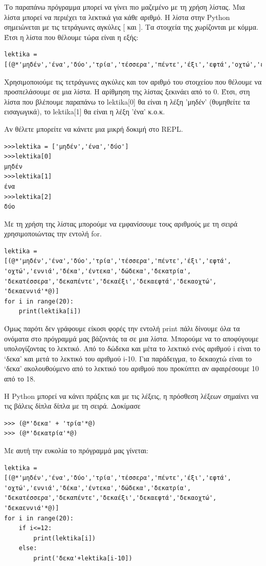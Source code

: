 \documentclass[b5paper,11pt,twoside,openleft]{memoir}
\begin{document}
Το παραπάνω πρόγραμμα μπορεί να γίνει πιο μαζεμένο με τη χρήση λίστας. Μια λίστα μπορεί να περιέχει τα λεκτικά για κάθε αριθμό. Η λίστα στην Python σημειώνεται με τις τετράγωνες αγκύλες [ και ]. Τα στοιχεία της χωρίζονται με κόμμα. Έτσι η λίστα που θέλουμε τώρα είναι η εξής:
\begin{lstlisting}
lektika = [(@*'μηδέν','ένα','δύο','τρία','τέσσερα','πέντε','έξι','εφτά','οχτώ','εννιά','δέκα','έντεκα','δώδεκα','δεκατρία','δεκατέσσερα','δεκαπέντε','δεκαέξι','δεκαεφτά','δεκαοχτώ','δεκαεννιά'*@)]
\end{lstlisting}
Χρησιμοποιούμε τις τετράγωνες αγκύλες και τον αριθμό του στοιχείου που θέλουμε να προσπελάσουμε σε μια λίστα. Η αρίθμηση της λίστας ξεκινάει από το 0. Έτσι, στη λίστα που βλέπουμε παραπάνω το lektika[0] θα είναι η λέξη 'μηδέν' (θυμηθείτε τα εισαγωγικά), το lektika[1] θα είναι η λέξη 'ένα' κ.ο.κ.

Αν θέλετε μπορείτε να κάνετε μια μικρή δοκιμή στο REPL.
\begin{lstlisting}
>>>lektika = ['μηδέν','ένα','δύο']
>>>lektika[0]
μηδέν
>>>lektika[1]
ένα
>>>lektika[2]
δύο
\end{lstlisting}
Με τη χρήση της λίστας μπορούμε να εμφανίσουμε τους αριθμούς με τη σειρά χρησιμοποιώντας την εντολή for.
\begin{lstlisting}
lektika = [(@*'μηδέν','ένα','δύο','τρία','τέσσερα','πέντε','έξι','εφτά',
'οχτώ','εννιά','δέκα','έντεκα','δώδεκα','δεκατρία',
'δεκατέσσερα','δεκαπέντε','δεκαέξι','δεκαεφτά','δεκαοχτώ',
'δεκαεννιά'*@)]
for i in range(20):
    print(lektika[i])
\end{lstlisting}

Όμως παρότι δεν γράφουμε είκοσι φορές την εντολή print πάλι δίνουμε όλα τα ονόματα στο πρόγραμμά μας βάζοντάς τα σε μια λίστα. Μπορούμε να το αποφύγουμε υπολογίζοντας το λεκτικό. Από το δώδεκα και μέτα το λεκτικό ενός αριθμού i είναι το `δεκα' και μετά το λεκτικό του αριθμού i-10. Για παράδειγμα, το δεκαοχτώ είναι το `δεκα' ακολουθούμενο από το λεκτικό του αριθμού που προκύπτει αν αφαιρέσουμε 10 από το 18.

Η Python μπορεί να κάνει πράξεις και με τις λέξεις, η πρόσθεση λέξεων σημαίνει να τις βάλεις δίπλα δίπλα με τη σειρά. Δοκίμασε 
\begin{lstlisting}
>>> (@*'δεκα' + 'τρία'*@)
>>> (@*'δεκατρία'*@)
\end{lstlisting}
Με αυτή την ευκολία το πρόγραμμά μας γίνεται:
\begin{lstlisting}
lektika = [(@*'μηδέν','ένα','δύο','τρία','τέσσερα','πέντε','έξι','εφτά',
'οχτώ','εννιά','δέκα','έντεκα','δώδεκα','δεκατρία',
'δεκατέσσερα','δεκαπέντε','δεκαέξι','δεκαεφτά','δεκαοχτώ',
'δεκαεννιά'*@)]
for i in range(20):
    if i<=12:
        print(lektika[i])
    else:
        print('δεκα'+lektika[i-10])
\end{lstlisting}
\end{document}
